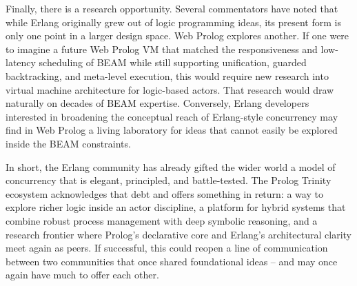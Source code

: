 Finally, there is a research opportunity. Several commentators have noted that while Erlang originally grew out of logic programming ideas, its present form is only one point in a larger design space. Web Prolog explores another. If one were to imagine a future Web Prolog VM that matched the responsiveness and low-latency scheduling of BEAM while still supporting unification, guarded backtracking, and meta-level execution, this would require new research into virtual machine architecture for logic-based actors. That research would draw naturally on decades of BEAM expertise. Conversely, Erlang developers interested in broadening the conceptual reach of Erlang-style concurrency may find in Web Prolog a living laboratory for ideas that cannot easily be explored inside the BEAM constraints.  

In short, the Erlang community has already gifted the wider world a model of concurrency that is elegant, principled, and battle-tested. The Prolog Trinity ecosystem acknowledges that debt and offers something in return: a way to explore richer logic inside an actor discipline, a platform for hybrid systems that combine robust process management with deep symbolic reasoning, and a research frontier where Prolog's declarative core and Erlang's architectural clarity meet again as peers. If successful, this could reopen a line of communication between two communities that once shared foundational ideas -- and may once again have much to offer each other.

